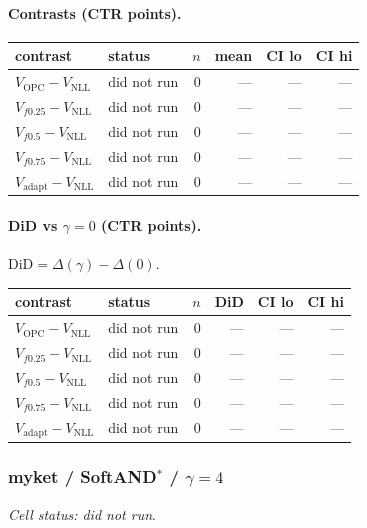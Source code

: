 \documentclass[10pt,a4paper]{article}
\begin{document}
\paragraph{Contrasts (CTR points).}
{\centering\small\begin{tabular}{llrrrr}
\toprule contrast & status & $n$ & mean & CI lo & CI hi \\
\midrule
$V_{\mathrm{OPC}}-V_{\mathrm{NLL}}$ & did not run & 0 & --- & --- & --- \\
$V_{f0.25}-V_{\mathrm{NLL}}$ & did not run & 0 & --- & --- & --- \\
$V_{f0.5}-V_{\mathrm{NLL}}$ & did not run & 0 & --- & --- & --- \\
$V_{f0.75}-V_{\mathrm{NLL}}$ & did not run & 0 & --- & --- & --- \\
$V_{\mathrm{adapt}}-V_{\mathrm{NLL}}$ & did not run & 0 & --- & --- & --- \\
\bottomrule\end{tabular}\par}
\paragraph{DiD vs $\gamma=0$ (CTR points).} $\mathrm{DiD}=\Delta(\gamma)-\Delta(0)$.
{\centering\small\begin{tabular}{llrrrr}
\toprule contrast & status & $n$ & DiD & CI lo & CI hi \\
\midrule
$V_{\mathrm{OPC}}-V_{\mathrm{NLL}}$ & did not run & 0 & --- & --- & --- \\
$V_{f0.25}-V_{\mathrm{NLL}}$ & did not run & 0 & --- & --- & --- \\
$V_{f0.5}-V_{\mathrm{NLL}}$ & did not run & 0 & --- & --- & --- \\
$V_{f0.75}-V_{\mathrm{NLL}}$ & did not run & 0 & --- & --- & --- \\
$V_{\mathrm{adapt}}-V_{\mathrm{NLL}}$ & did not run & 0 & --- & --- & --- \\
\bottomrule\end{tabular}\par}
\bigskip
\subsubsection{myket / SoftAND$^*$ / $\gamma=4$}
\emph{Cell status: did not run}.
\end{document}
